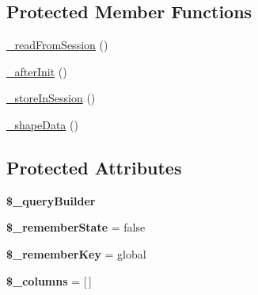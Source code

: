 \subsection*{Protected Member Functions}
\begin{DoxyCompactItemize}
\item 
\hyperlink{classhamburgscleanest_1_1_data_tables_1_1_models_1_1_data_component_ae682ac7f1f1f9516c3cc2485ae5bcf4b}{\+\_\+read\+From\+Session} ()
\item 
\hyperlink{classhamburgscleanest_1_1_data_tables_1_1_models_1_1_data_component_a8b97dff3fa609aaed04b448e535ba0cc}{\+\_\+after\+Init} ()
\item 
\hyperlink{classhamburgscleanest_1_1_data_tables_1_1_models_1_1_data_component_a28881ca4bf07d4008e3ed3128198da59}{\+\_\+store\+In\+Session} ()
\item 
\hyperlink{classhamburgscleanest_1_1_data_tables_1_1_models_1_1_data_component_a6d4fda1024fd883f0750e5f0c531160d}{\+\_\+shape\+Data} ()
\end{DoxyCompactItemize}
\subsection*{Protected Attributes}
\begin{DoxyCompactItemize}
\item 
\mbox{\label{classhamburgscleanest_1_1_data_tables_1_1_models_1_1_data_component_aa4dd6d6d5979d3ee49570921a0772e00}} 
{\bfseries \$\+\_\+query\+Builder}
\item 
\mbox{\label{classhamburgscleanest_1_1_data_tables_1_1_models_1_1_data_component_a57effc70e4d12c60eb1f210d9870a43b}} 
{\bfseries \$\+\_\+remember\+State} = false
\item 
\mbox{\label{classhamburgscleanest_1_1_data_tables_1_1_models_1_1_data_component_af1957828bb9ad0679ab529f6dbf639af}} 
{\bfseries \$\+\_\+remember\+Key} = \textquotesingle{}global\textquotesingle{}
\item 
\mbox{\label{classhamburgscleanest_1_1_data_tables_1_1_models_1_1_data_component_a5fceff2607cd15442917d37141b168d1}} 
{\bfseries \$\+\_\+columns} = \mbox{[}$\,$\mbox{]}
\end{DoxyCompactItemize}


